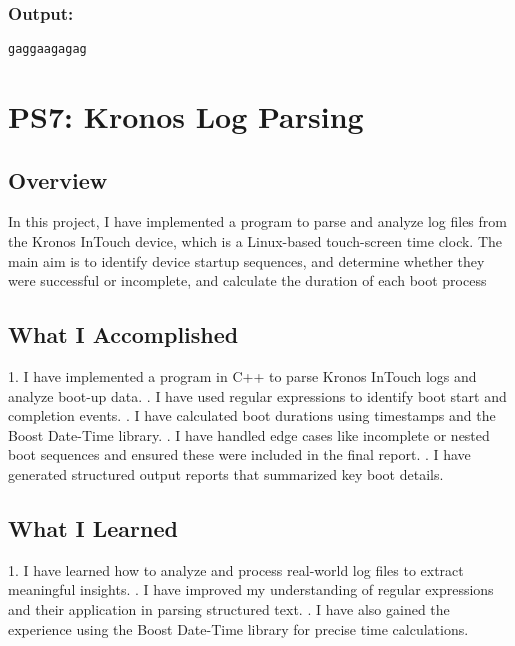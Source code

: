 \documentclass[12pt]{article}
\begin{document}
\subsubsection{Output:}
\begin{lstlisting}[style=cppcode]
gaggaagagag
\end{lstlisting}
\newpage
\section{PS7: Kronos Log Parsing}
\subsection{Overview}
In this project, I have implemented a program to parse and analyze log files from the Kronos InTouch device, which is a Linux-based touch-screen time clock. The main aim is to identify device startup sequences, and  determine whether they were successful or incomplete, and calculate the duration of each boot process
\subsection{What I Accomplished}
1. I have implemented a program in C++ to parse Kronos InTouch logs and analyze boot-up data.
. I have used regular expressions to identify boot start and completion events.
. I have calculated boot durations using timestamps and the Boost Date-Time library.
. I have  handled edge cases like incomplete or nested boot sequences and ensured these were included in the final report.
. I have generated structured output reports that summarized key boot details.
\subsection{What I Learned}
1. I have learned how to analyze and process real-world log files to extract meaningful insights.
. I have improved my understanding of regular expressions and their application in parsing structured text.
. I have also gained the experience using the Boost Date-Time library for precise time calculations.
\end{document}
